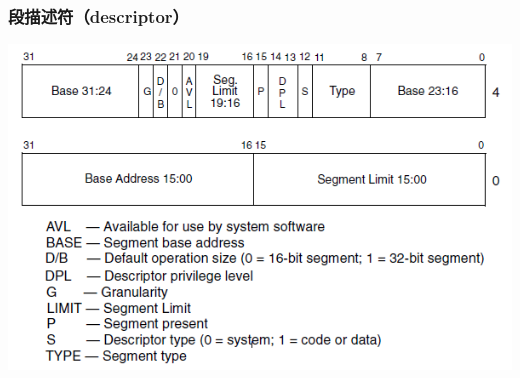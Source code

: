 \documentclass[CJKutf8,xcolor=pdftex,dvipsnames,table]{beamer}
\begin{document}
\begin{CJK*}{UTF8}{song}

  
  \begin{frame}
  \frametitle{段描述符（descriptor）} \pause
  \begin{center}
    \includegraphics[scale=.5]{x86sd}
  \end{center}
  \end{frame}
  

\end{CJK*}
\end{document}
